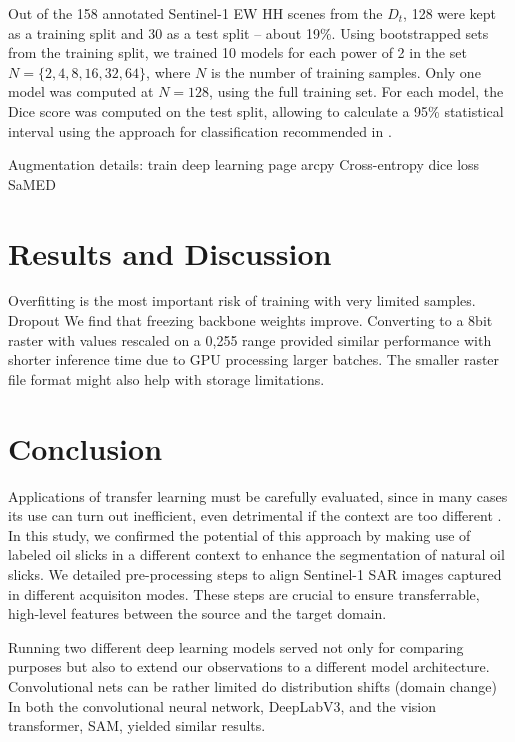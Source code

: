 \documentclass[journal]{IEEEtran}
\begin{document}
Out of the 158 annotated Sentinel-1 EW HH scenes from the $\mathit{D}_t$, 128 were kept as a training split and 30 as a test split – about 19\%. Using bootstrapped sets from the training split, we trained
10 models for each power of 2 in the set \( N = \{ 2, 4, 8, 16, 32, 64\} \), where \( N \) is the number of training samples. Only one model was computed at \( N = 128\), using the full training set. For each model,
the Dice score was computed on the test split, allowing to calculate a 95\% statistical interval using the approach for classification recommended in \cite{burkovMachineLearningEngineering2020}.

Augmentation details: train deep learning page arcpy
Cross-entropy dice loss SaMED


\section{Results and Discussion}

Overfitting is the most important risk of training with very limited samples. 
Dropout
We find that freezing backbone weights improve. Converting to a 8bit raster with values rescaled on a 0,255 range provided similar performance with shorter inference time due to GPU processing larger batches. 
The smaller raster file format might also help with storage limitations.

\section{Conclusion}
Applications of transfer learning must be carefully evaluated, since in many cases its use can turn out inefficient, even detrimental if the context are too different \cite{mensinkFactorsInfluenceTransfer2022}.
In this study, we confirmed the potential of this approach by making use of labeled oil slicks in a different context to enhance the segmentation of natural oil slicks. We detailed pre-processing steps to
align Sentinel-1 SAR images captured in different acquisiton modes. These steps are crucial to ensure transferrable, high-level features between the source and the target domain. 

Running two different deep learning models served not only for comparing purposes but also to extend our observations to a different model architecture. 
Convolutional nets can be rather limited do distribution shifts (domain change) \cite{hoffmanOneShotAdaptationSupervised2014,djolongaRobustnessTransferabilityConvolutional2021}
In both the convolutional neural network, DeepLabV3, and the vision transformer, SAM, 
yielded similar results.
\end{document}

